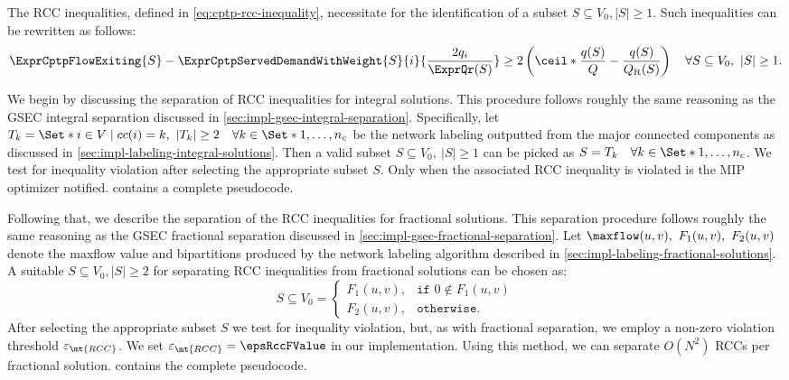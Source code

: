 The RCC inequalities, defined in \cref{eq:cptp-rcc-inequality},
necessitate for the identification of a subset $S \subseteq V_0, |S| \ge 1$.
Such inequalities can be rewritten as follows:
\begin{equation}
	\ExprCptpFlowExiting{S} - \ExprCptpServedDemandWithWeight{S}{i}{\frac{2 q_i}{\ExprQr(S)}}    \ge   2 \left( \ceil*{ \frac{q(S)}{Q}} - \frac{q(S)}{Q_{\mathrm{R}}(S)} \right) \quad \forall S \subseteq V_0,\ |S| \ge 1.
\end{equation}

We begin by discussing the separation of RCC inequalities for integral solutions.
This procedure follows roughly the same reasoning
as the GSEC integral separation discussed in \cref{sec:impl-gsec-integral-separation}.
Specifically, let $T_k  = \Set*{i \in V \mid cc(i) = k},\ |T_k| \ge 2 \quad \forall k \in \Set*{1, \dots, n_c}$
be the network labeling outputted from the major connected components as discussed in \cref{sec:impl-labeling-integral-solutions}.
Then a valid subset $S \subseteq V_0,\ |S| \ge 1$ can be picked as $S = T_k \quad \forall k \in \Set*{1, \dots, n_c}$.
We test for inequality violation after selecting the appropriate subset $S$.
Only when the associated RCC inequality is violated is the MIP optimizer notified.
 contains a complete pseudocode.

Following that, we describe the separation of the RCC inequalities for fractional solutions.
This separation procedure follows roughly the same reasoning
as the GSEC fractional separation discussed in \cref{sec:impl-gsec-fractional-separation}.
Let $\maxflow(u, v),\ F_1(u, v),\ F_2(u, v)$ denote the maxflow value and bipartitions
produced by the network labeling algorithm described in \cref{sec:impl-labeling-fractional-solutions}.
A suitable $S \subseteq V_0, |S| \ge 2$ for separating RCC inequalities
from fractional solutions can be chosen as:
\begin{equation}
	S \subseteq V_0 =
	\begin{cases}
		F_1(u, v), & \texttt{if } 0 \notin F_1(u, v) \\
		F_2(u, v), & \texttt{otherwise}.
	\end{cases}
\end{equation}
After selecting the appropriate subset $S$ we test for inequality violation, but,
as with fractional separation, we employ a non-zero violation threshold $\varepsilon_{\mt{RCC}}$.
We set $\varepsilon_{\mt{RCC}} = \epsRccFValue$ in our implementation.
Using this method, we can separate $O(N^2)$ RCCs per fractional solution.
 contains the complete pseudocode.


